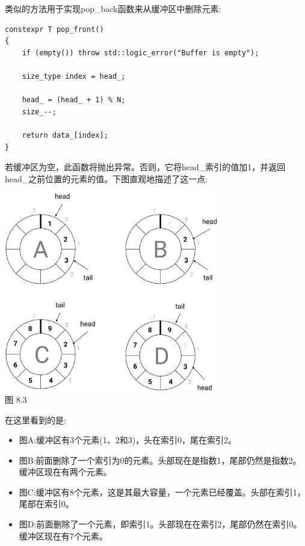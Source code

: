 类似的方法用于实现pop\_back函数来从缓冲区中删除元素:

\begin{lstlisting}[style=styleCXX]
constexpr T pop_front()
{
	if (empty()) throw std::logic_error("Buffer is empty");
	
	size_type index = head_;
	
	head_ = (head_ + 1) % N;
	size_--;
	
	return data_[index];
}
\end{lstlisting}

若缓冲区为空，此函数将抛出异常。否则，它将head\_索引的值加1，并返回head\_之前位置的元素的值。下图直观地描述了这一点:

\begin{center}
\includegraphics[width=0.7\textwidth]{content/3/chapter8/images/3.png}\\
图 8.3
\end{center}

在这里看到的是:

\begin{itemize}
\item
图A:缓冲区有3个元素(1、2和3)，头在索引0，尾在索引2。

\item
图B:前面删除了一个索引为0的元素。头部现在是指数1，尾部仍然是指数2。缓冲区现在有两个元素。

\item
图C:缓冲区有8个元素，这是其最大容量，一个元素已经覆盖。头部在索引1，尾部在索引0。

\item
图D:前面删除了一个元素，即索引1。头部现在在索引2，尾部仍然在索引0。缓冲区现在有7个元素。
\end{itemize}


